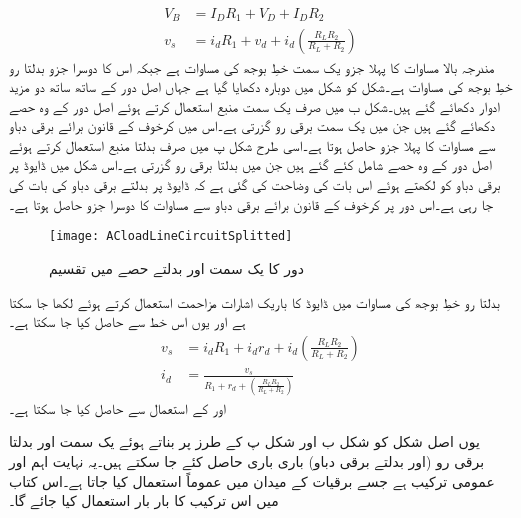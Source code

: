 \begin{align} \label{مساوات_ٹرانزسٹر_یکسمتی_بدلتا_بار_کے_خط}
V_B&=I_D R_1 +V_D+I_D R_2\\
v_s&=i_d R_1+v_d+i_d \left (\frac{R_L R_2}{R_L+R_2} \right )
\end{align}
مندرجہ بالا مساوات کا پہلا جزو یک سمت خطِ بوجھ کی مساوات ہے جبکہ اس کا دوسرا جزو بدلتا رو خطِ بوجھ کی مساوات ہے۔شکل  کو شکل  میں دوبارہ دکھایا گیا ہے جہاں اصل دور کے ساتھ ساتھ دو مزید ادوار دکھائے گئے ہیں۔شکل  ب میں صرف  یک سمت منبع  استعمال کرتے ہوئے اصل دور کے وہ حصے دکھائے گئے ہیں جن میں یک سمت برقی رو  گزرتی ہے۔اس میں کرخوف کے قانون برائے برقی دباو سے مساوات  کا پہلا جزو حاصل ہوتا ہے۔اسی طرح شکل  پ میں صرف بدلتا منبع  استعمال کرتے ہوئے اصل دور کے وہ حصے شامل کئے گئے ہیں جن میں بدلتا برقی رو  گزرتی ہے۔اس شکل میں ڈایوڈ پر برقی دباو کو  لکھتے ہوئے اس بات کی وضاحت کی گئی ہے کہ ڈایوڈ پر بدلتے برقی دباو کی بات کی جا رہی ہے۔اس دور پر کرخوف کے قانون برائے برقی دباو سے مساوات   کا دوسرا جزو حاصل ہوتا ہے۔
\begin{figure}
\centering
\texttt{[image: ACloadLineCircuitSplitted]}
\caption{دور کا یک سمت اور بدلتے حصے میں تقسیم }
\label{شکل_دور_کا_یکسمتی_اور_بدلتا_حصہ}
\end{figure}
بدلتا رو خطِ بوجھ کی مساوات میں ڈایوڈ کا باریک اشارات مزاحمت   استعمال کرتے ہوئے  لکھا جا سکتا ہے اور یوں اس خط سے   حاصل کیا جا سکتا ہے۔
\begin{align*}
v_s&=i_d R_1+i_d r_d + i_d \left (\frac{R_L R_2}{R_L+R_2} \right )\\
i_d&=\frac{v_s}{R_1+r_d+\left (\frac{R_L R_2}{R_L+R_2} \right )}
\end{align*}
اور   کے استعمال سے حاصل کیا جا سکتا ہے۔

یوں اصل شکل کو شکل  ب اور شکل  پ کے طرز پر بناتے ہوئے یک سمت اور بدلتا برقی رو (اور بدلتے برقی دباو) باری باری حاصل کئے جا سکتے ہیں۔یہ نہایت اہم اور عمومی ترکیب ہے جسے برقیات کے میدان میں عموماً استعمال کیا جاتا ہے۔اس کتاب میں اس ترکیب کا بار بار استعمال کیا جائے گا۔ 

